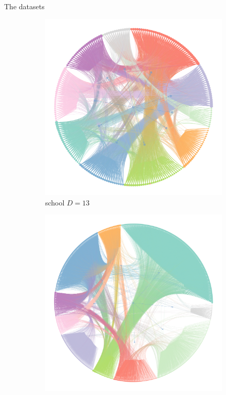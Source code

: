 \documentclass{beamer}
\begin{document}
\begin{frame}{The datasets}
\begin{figure}[!h]
\begin{subfigure}[t]{0.3\linewidth}
				\includegraphics[width=\linewidth]{school-graph.png}
				\caption{school $D=13$}
				\label{fig:school-graph}
			\end{subfigure}
			\hfill
			\begin{subfigure}[t]{0.3\linewidth}
				\centering
				\includegraphics[width=\linewidth]{fb-graph.png}

\end{subfigure}
\end{figure}
\end{frame}
\end{document}
